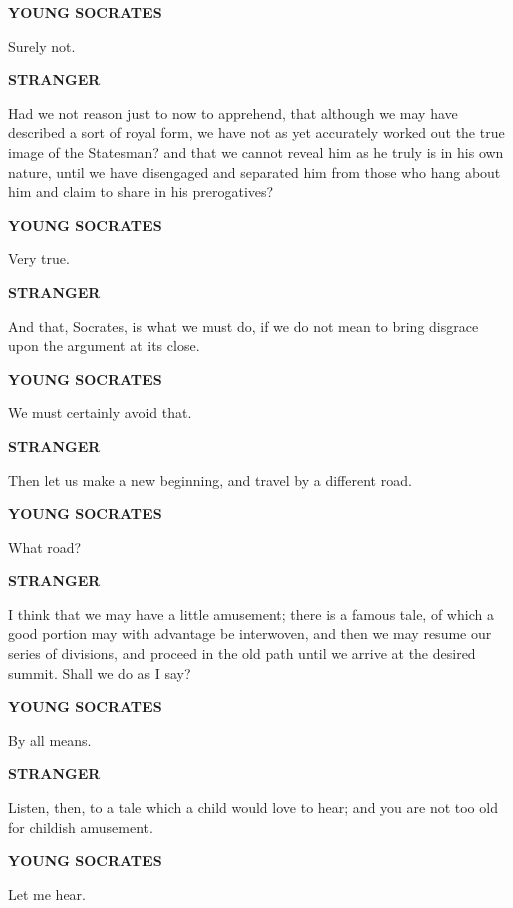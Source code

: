 \documentclass[11pt,letter]{article}
\begin{document}
\par \textbf{YOUNG SOCRATES}
\par   Surely not.

\par \textbf{STRANGER}
\par   Had we not reason just to now to apprehend, that although we may have described a sort of royal form, we have not as yet accurately worked out the true image of the Statesman? and that we cannot reveal him as he truly is in his own nature, until we have disengaged and separated him from those who hang about him and claim to share in his prerogatives?

\par \textbf{YOUNG SOCRATES}
\par   Very true.

\par \textbf{STRANGER}
\par   And that, Socrates, is what we must do, if we do not mean to bring disgrace upon the argument at its close.

\par \textbf{YOUNG SOCRATES}
\par   We must certainly avoid that.

\par \textbf{STRANGER}
\par   Then let us make a new beginning, and travel by a different road.

\par \textbf{YOUNG SOCRATES}
\par   What road?

\par \textbf{STRANGER}
\par   I think that we may have a little amusement; there is a famous tale, of which a good portion may with advantage be interwoven, and then we may resume our series of divisions, and proceed in the old path until we arrive at the desired summit. Shall we do as I say?

\par \textbf{YOUNG SOCRATES}
\par   By all means.

\par \textbf{STRANGER}
\par   Listen, then, to a tale which a child would love to hear; and you are not too old for childish amusement.

\par \textbf{YOUNG SOCRATES}
\par   Let me hear.
\end{document}
